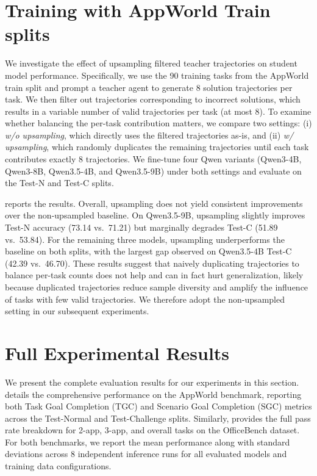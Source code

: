 
\section{Training with AppWorld Train splits}
\label{app:upsampling}

We investigate the effect of upsampling filtered teacher trajectories on student model performance. Specifically, we use the 90 training tasks from the AppWorld train split and prompt a teacher agent to generate 8 solution trajectories per task. We then filter out trajectories corresponding to incorrect solutions, which results in a variable number of valid trajectories per task (at most 8). To examine whether balancing the per-task contribution matters, we compare two settings: (i) \emph{w/o upsampling}, which directly uses the filtered trajectories as-is, and (ii) \emph{w/ upsampling}, which randomly duplicates the remaining trajectories until each task contributes exactly 8 trajectories. We fine-tune four Qwen variants (Qwen3-4B, Qwen3-8B, Qwen3.5-4B, and Qwen3.5-9B) under both settings and evaluate on the Test-N and Test-C splits.

 reports the results. Overall, upsampling does not yield consistent improvements over the non-upsampled baseline. On Qwen3.5-9B, upsampling slightly improves Test-N accuracy (73.14 vs.\ 71.21) but marginally degrades Test-C (51.89 vs.\ 53.84). For the remaining three models, upsampling underperforms the baseline on both splits, with the largest gap observed on Qwen3.5-4B Test-C (42.39 vs.\ 46.70). These results suggest that naively duplicating trajectories to balance per-task counts does not help and can in fact hurt generalization, likely because duplicated trajectories reduce sample diversity and amplify the influence of tasks with few valid trajectories. We therefore adopt the non-upsampled setting in our subsequent experiments.

\section{Full Experimental Results}
\label{sec:app-full-results}
We present the complete evaluation results for our experiments in this section.  details the comprehensive performance on the AppWorld benchmark, reporting both Task Goal Completion (TGC) and Scenario Goal Completion (SGC) metrics across the Test-Normal and Test-Challenge splits. Similarly,  provides the full pass rate breakdown for 2-app, 3-app, and overall tasks on the OfficeBench dataset. For both benchmarks, we report the mean performance along with standard deviations across 8 independent inference runs for all evaluated models and training data configurations.

